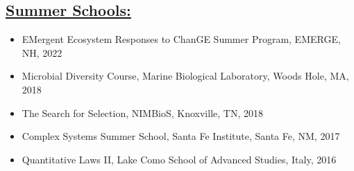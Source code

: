 \documentclass[]{res}
\begin{document}
\begin{resume}
\section{\underline{Summer Schools:}}%
\begin{itemize}[leftmargin=*]
\item[] {EMergent Ecosystem Responses to ChanGE Summer Program}, EMERGE, NH, 2022
\item[] {Microbial Diversity Course}, Marine Biological Laboratory, Woods Hole, MA, 2018
\item[] {The Search for Selection}, NIMBioS, Knoxville, TN, 2018
\item[] {Complex Systems Summer School}, Santa Fe Institute, Santa Fe, NM, 2017
\item[] {Quantitative Laws II}, Lake Como School of Advanced Studies, Italy, 2016  
 \end{itemize}  
 
  

\end{resume}
\end{document}
